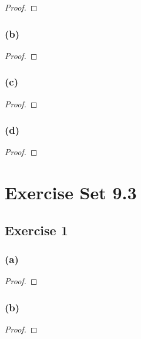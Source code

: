 \documentclass[14pt]{extarticle}
\begin{document}
\begin{proof}

\end{proof}

\subsubsection{(b)}

\begin{proof}

\end{proof}

\subsubsection{(c)}

\begin{proof}

\end{proof}

\subsubsection{(d)}

\begin{proof}

\end{proof}

\section{Exercise Set 9.3}

\subsection{Exercise 1}

\subsubsection{(a)}

\begin{proof}

\end{proof}

\subsubsection{(b)}

\begin{proof}

\end{proof}
\end{document}
